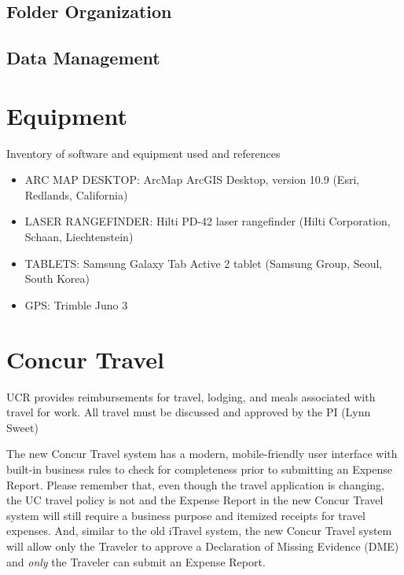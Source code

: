 \documentclass[
]{book}
\begin{document}
\hypertarget{folder-organization}{%
\section{Folder Organization}\label{folder-organization}}

\hypertarget{data-management}{%
\section{Data Management}\label{data-management}}

\hypertarget{equipment}{%
\chapter{Equipment}\label{equipment}}

Inventory of software and equipment used and references

\begin{itemize}
\item
  ARC MAP DESKTOP: ArcMap ArcGIS Desktop, version 10.9 (Esri, Redlands, California)
\item
  LASER RANGEFINDER: Hilti PD-42 laser rangefinder (Hilti Corporation, Schaan, Liechtenstein)
\item
  TABLETS: Samsung Galaxy Tab Active 2 tablet (Samsung Group, Seoul, South Korea)
\item
  GPS: Trimble Juno 3
\end{itemize}

\hypertarget{concur}{%
\chapter{Concur Travel}\label{concur}}

UCR provides reimbursements for travel, lodging, and meals associated with travel for work. All travel must be discussed and approved by the PI (Lynn Sweet)

The new Concur Travel system has a modern, mobile-friendly user interface with built-in business rules to check for completeness prior to submitting an Expense Report. Please remember that, even though the travel application is changing, the UC travel policy is not and the Expense Report in the new Concur Travel system will still require a business purpose and itemized receipts for travel expenses. And, similar to the old iTravel system, the new Concur Travel system will allow only the Traveler to approve a Declaration of Missing Evidence (DME) and \emph{only} the Traveler can submit an Expense Report.
\end{document}
